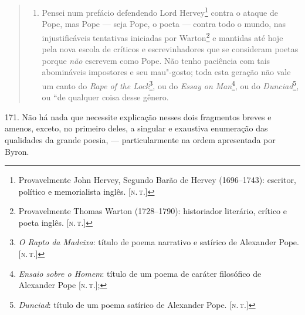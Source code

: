\begin{quote}
\begin{enumerate}[label=(\arabic*)]
\item\mbox{} Pensei num prefácio defendendo Lord Hervey\footnote{Provavelmente
  John Hervey, Segundo Barão de Hervey (1696--1743): escritor, político e
  memorialista inglês. {[}\textsc{n.\,t.}{]}} contra o ataque de Pope, mas Pope
--- seja Pope, o poeta --- contra todo o mundo, nas injustificáveis
tentativas iniciadas por Warton\footnote{Provavelmente Thomas Warton
  (1728--1790): historiador literário, crítico e poeta inglês. {[}\textsc{n.\,t.}{]}} e mantidas até hoje pela nova escola de críticos e
escrevinhadores que se consideram poetas porque \emph{não} escrevem como
Pope. Não tenho paciência com tais abomináveis impostores e seu
mau"-gosto; toda esta geração não vale um canto do \emph{Rape of the
Lock}\footnote{\emph{O Rapto da Madeixa}: título de poema narrativo e
  satírico de Alexander Pope. {[}\textsc{n.\,t.}{]}}, ou do \emph{Essay on}
\emph{Man}\footnote{\emph{Ensaio sobre o Homem}: título de um poema de
  caráter filosófico de Alexander Pope {[}\textsc{n.\,t.}{]};}, ou do
\emph{Dunciad}\footnote{\emph{Dunciad}: título de um poema satírico de
  Alexander Pope. {[}\textsc{n.\,t.}{]}}, ou ``de qualquer coisa desse
gênero.
\end{enumerate}
\end{quote}

171. Não há nada que necessite explicação nesses dois fragmentos breves
e amenos, exceto, no primeiro deles, a singular e exaustiva enumeração
das qualidades da grande poesia, --- particularmente na ordem apresentada
por Byron.

